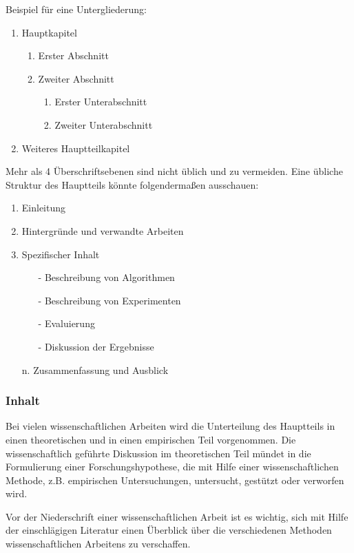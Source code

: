 Beispiel für eine Untergliederung:
%
\begin{enumerate}[label=\arabic*]
  \item Hauptkapitel
  \begin{enumerate}[label=\arabic{enumi}.\arabic*]
    \item Erster Abschnitt
    \item Zweiter Abschnitt
    \begin{enumerate}[label=\arabic{enumi}.\arabic{enumii}.\arabic*]
       \item Erster Unterabschnitt
       \item Zweiter Unterabschnitt
    \end{enumerate}
  \end{enumerate}
  \item Weiteres Hauptteilkapitel
\end{enumerate}
\bigskip

Mehr als 4 Überschriftsebenen sind nicht üblich und zu vermeiden. Eine übliche Struktur des Hauptteils könnte folgendermaßen ausschauen:
\begin{enumerate}
  \item Einleitung
  \item Hintergründe und verwandte Arbeiten
  \item Spezifischer Inhalt
  \begin{itemize}
    \item[-] Beschreibung von Algorithmen
    \item[-] Beschreibung von Experimenten
    \item[-] Evaluierung
    \item[-] Diskussion der Ergebnisse
  \end{itemize}
  \item[n.] Zusammenfassung und Ausblick
\end{enumerate}

\subsubsection{Inhalt}\label{sec:structure:main:content}
%
Bei vielen wissenschaftlichen Arbeiten wird die Unterteilung des Hauptteils in einen theoretischen und in einen empirischen Teil vorgenommen. Die wissenschaftlich geführte Diskussion im theoretischen Teil mündet in die Formulierung einer Forschungshypothese, die mit Hilfe einer wissenschaftlichen Methode, z.B. empirischen Untersuchungen, untersucht, gestützt oder verworfen wird.

Vor der Niederschrift einer wissenschaftlichen Arbeit ist es wichtig, sich mit Hilfe der einschlägigen Literatur einen Überblick über die verschiedenen Methoden wissenschaftlichen Arbeitens zu verschaffen.
